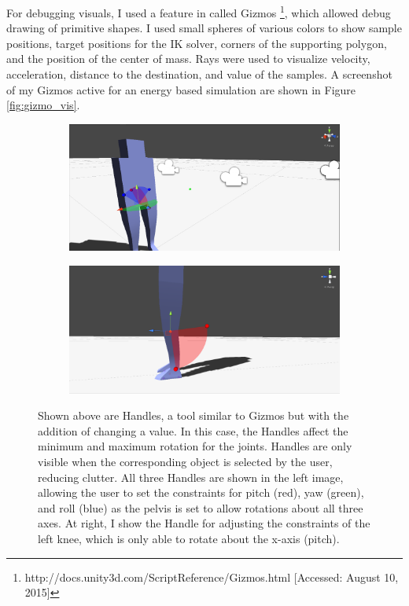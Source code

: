 For debugging visuals, I used a feature in \unity{} called Gizmos \footnote{http://docs.unity3d.com/ScriptReference/Gizmos.html [Accessed: August 10, 2015]}, which allowed debug drawing of primitive shapes.  I used small spheres of various colors to show sample positions, target positions for the IK solver, corners of the supporting polygon, and the position of the center of mass.  Rays were used to visualize velocity, acceleration, distance to the destination, and value of the samples.  A screenshot of my Gizmos active for an energy based simulation are shown in Figure \ref{fig:gizmo_vis}.

\begin{figure}[ht]
	\centering
	\begin{subfigure}[b]{0.49\textwidth}
		\includegraphics[width=\textwidth]{images/handles1.png}
	\end{subfigure}
	\begin{subfigure}[b]{0.49\textwidth}
		\includegraphics[width=\textwidth]{images/handles2.png}
	\end{subfigure}
	\caption[Screenshot of Handles used for setting and visualizing joint constraints in \unity{}]{Shown above are Handles, a tool similar to Gizmos but with the addition of changing a value.  In this case, the Handles affect the minimum and maximum rotation for the joints.  Handles are only visible when the corresponding object is selected by the user, reducing clutter.  All three Handles are shown in the left image, allowing the user to set the constraints for pitch (red), yaw (green), and roll (blue) as the pelvis is set to allow rotations about all three axes.  At right, I show the Handle for adjusting the constraints of the left knee, which is only able to rotate about the x-axis (pitch).}
	\label{fig:handle_vis}
\end{figure}

